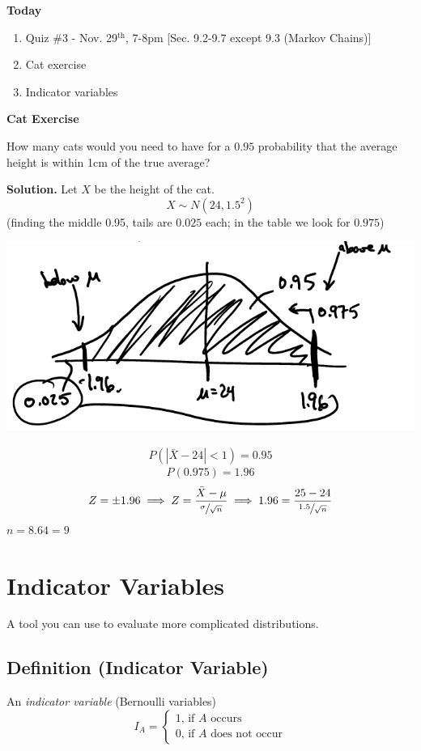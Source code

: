 \textbf{Today}
\begin{enumerate}
    \item Quiz \#3 - Nov. 29$^\text{th}$, 7-8pm [Sec. 9.2-9.7 except 9.3 (Markov Chains)]
    \item Cat exercise
    \item Indicator variables
\end{enumerate}
\textbf{Cat Exercise}

How many cats would you need to have for a $ 0.95 $ probability
that the average height is within 1cm of the true average?

\textbf{Solution.}
Let $ X $ be the height of the cat.
\[ X \sim N(24,1.5^2) \]
(finding the middle 0.95, tails are $ 0.025 $ each; in the table we look
for $ 0.975 $)

\begin{center}
    \includegraphics{catscurve.png}
\end{center}
\begin{align*}
    P\left(\left|\bar{X}-24\right|<1\right)=0.95
\end{align*}
\[ P(0.975)=1.96 \]
\[ Z=\pm 1.96\implies Z=\frac{\bar{X}-\mu}{\sfrac{\sigma}{\sqrt{n}}}
    \implies 1.96=\frac{25-24}{\sfrac{1.5}{\sqrt{n}}} \]
$ n=8.64=9 $

\section{Indicator Variables}
A tool you can use to evaluate more complicated distributions.

\begin{defbox}
    \subsection{Definition (Indicator Variable)}
    An \emph{indicator variable} (Bernoulli variables)
    \[ I_A=
        \begin{cases}
            1,\,\text{if $A$ occurs} \\
            0,\,\text{if $A$ does not occur}
        \end{cases} \]
\end{defbox}

